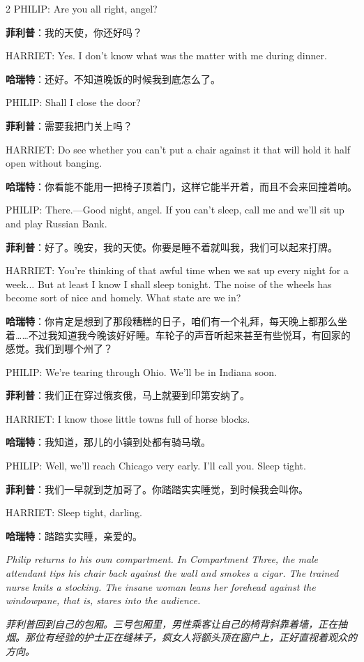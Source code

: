 \documentclass[lang=cn,newtx,10pt,scheme=chinese]{elegantbook}
\newcommand{\pair}[2]{%
\switchcolumn* #2\par
\switchcolumn  #1\par
}
\begin{document}
\begin{paracol}{2}
\pair{
    \textbf{菲利普}：我的天使，你还好吗？
}{
    PHILIP: Are you all right, angel?
}

\pair{
    \textbf{哈瑞特}：还好。不知道晚饭的时候我到底怎么了。
}{
    HARRIET: Yes. I don't know what was the matter with me during dinner.
}

\pair{
    \textbf{菲利普}：需要我把门关上吗？
}{
    PHILIP: Shall I close the door?
}

\pair{
    \textbf{哈瑞特}：你看能不能用一把椅子顶着门，这样它能半开着，而且不会来回撞着响。
}{
    HARRIET: Do see whether you can't put a chair against it that will hold it half open without banging.
}

\pair{
    \textbf{菲利普}：好了。晚安，我的天使。你要是睡不着就叫我，我们可以起来打牌。
}{
    PHILIP: There.—Good night, angel. If you can't sleep, call me and we'll sit up and play Russian Bank.
}

\pair{
    \textbf{哈瑞特}：你肯定是想到了那段糟糕的日子，咱们有一个礼拜，每天晚上都那么坐着……不过我知道我今晚该好好睡。车轮子的声音听起来甚至有些悦耳，有回家的感觉。我们到哪个州了？
}{
    HARRIET: You're thinking of that awful time when we sat up every night for a week... But at least I know I shall sleep tonight. The noise of the wheels has become sort of nice and homely. What state are we in?
}

\pair{
    \textbf{菲利普}：我们正在穿过俄亥俄，马上就要到印第安纳了。
}{
    PHILIP: We're tearing through Ohio. We'll be in Indiana soon.
}

\pair{
    \textbf{哈瑞特}：我知道，那儿的小镇到处都有骑马墩。
}{
    HARRIET: I know those little towns full of horse blocks.
}

\pair{
    \textbf{菲利普}：我们一早就到芝加哥了。你踏踏实实睡觉，到时候我会叫你。
}{
    PHILIP: Well, we'll reach Chicago very early. I'll call you. Sleep tight.
}

\pair{
    \textbf{哈瑞特}：踏踏实实睡，亲爱的。
}{
    HARRIET: Sleep tight, darling.
    \newline
    \newline
}

\pair{
    \textit{菲利普回到自己的包厢。三号包厢里，男性乘客让自己的椅背斜靠着墙，正在抽烟。那位有经验的护士正在缝袜子，疯女人将额头顶在窗户上，正好直视着观众的方向。}
}{
    \textit{Philip returns to his own compartment. In Compartment Three, the male attendant tips his chair back against the wall and smokes a cigar. The trained nurse knits a stocking. The insane woman leans her forehead against the windowpane, that is, stares into the audience.}
    \newline
    \newline
}


\end{paracol}
\end{document}

